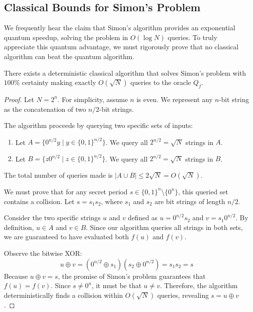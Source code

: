 \subsection{Classical Bounds for Simon's Problem}
We frequently hear the claim that Simon's algorithm provides an exponential quantum speedup, solving the problem in $O(\log N)$ queries. To truly appreciate this quantum advantage, we must rigorously prove that no classical algorithm can beat the quantum algorithm. 

\begin{theorem}
    There exists a deterministic classical algorithm that solves Simon's problem with $100\%$ certainty making exactly $O(\sqrt{N})$ queries to the oracle $Q_f$.
\end{theorem}

\begin{proof}
    Let $N = 2^n$. For simplicity, assume $n$ is even. We represent any $n$-bit string as the concatenation of two $n/2$-bit strings.

    The algorithm proceeds by querying two specific sets of inputs:
    \begin{enumerate}
        \item Let $A = \{ 0^{n/2}y \mid y \in \{0, 1\}^{n/2} \}$. We query all $2^{n/2} = \sqrt{N}$ strings in $A$.
        \item Let $B = \{ z0^{n/2} \mid z \in \{0, 1\}^{n/2} \}$. We query all $2^{n/2} = \sqrt{N}$ strings in $B$.
    \end{enumerate}
    The total number of queries made is $|A \cup B| \leq 2\sqrt{N} = O(\sqrt{N})$.

    We must prove that for any secret period $s \in \{0, 1\}^n \setminus \{0^n\}$, this queried set contains a collision. Let $s = s_1 s_2$, where $s_1$ and $s_2$ are bit strings of length $n/2$. 

    Consider the two specific strings $u$ and $v$ defined as $u = 0^{n/2} s_2$ and $v = s_1 0^{n/2}$. By definition, $u \in A$ and $v \in B$. Since our algorithm queries all strings in both sets, we are guaranteed to have evaluated both $f(u)$ and $f(v)$. 

    Observe the bitwise XOR:
    \[ u \oplus v = (0^{n/2} \oplus s_1)(s_2 \oplus 0^{n/2}) = s_1 s_2 = s \]
    Because $u \oplus v = s$, the promise of Simon's problem guarantees that $f(u) = f(v)$. Since $s \neq 0^n$, it must be that $u \neq v$. Therefore, the algorithm deterministically finds a collision within $O(\sqrt{N})$ queries, revealing $s = u \oplus v$.
\end{proof}

